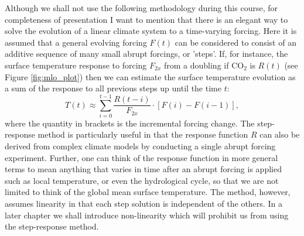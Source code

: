 \documentclass[12pt]{book}
\begin{document}
Although we shall not use the following methodology during this course, for completeness  of presentation I want to mention that there is an elegant way to solve the evolution of a linear climate system to a time-varying forcing. Here it is assumed that a general evolving forcing $F(t)$ can be considered to consist of an additive sequence of many small abrupt forcings, or 'steps'. If, for instance, the surface temperature response to forcing $F_{2x}$ from a doubling if CO$_2$ is $R(t)$ (see Figure \ref{fig:mlo_plot}) then we can estimate the surface temperature evolution as a sum of the response to all previous steps up until the time $t$:
$$ T(t) \approx \sum_{i=0}^{t-1} \frac{R(t-i)}{F_{2x}}\cdot \left[F(i)-F(i-1)\right], $$
where the quantity in brackets is the incremental forcing change. The step-response method is particularly useful in that the response function $R$ can also be derived from complex climate models by conducting a single abrupt forcing experiment. Further, one can think of the response function in more general terms to mean anything that varies in time after an abrupt forcing is applied such as local temperature, or even the hydrological cycle, so that we are not limited to think of the global mean surface temperature. The method, however, assumes linearity in that each step solution is independent of the others. In a later chapter we shall introduce non-linearity which will prohibit us from using the step-response method.
\end{document}
